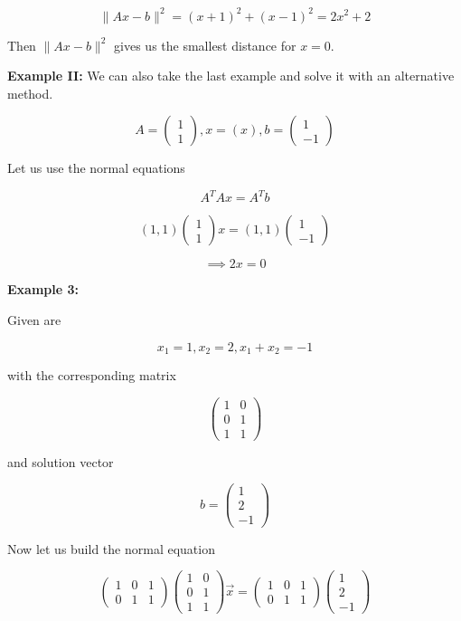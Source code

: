 \[
	\| Ax - b \|^2 = (x + 1)^2 + (x - 1)^2 = 2x^2 + 2 
\]

Then \(\| Ax - b \|^2\) gives us the smallest distance for \(x = 0\).
\vspace{\baselineskip}

\textbf{Example II:}
\vspace{\baselineskip}
We can also take the last example and solve it with an alternative method.

\[
	A = \begin{pmatrix} 1 \\ 1 \end{pmatrix}, x = (x), b = \begin{pmatrix} 1 \\ -1 \end{pmatrix}
\]

Let us use the normal equations

\[
	A^T Ax = A^T b
\]

\[
	(1, 1) 
	\begin{pmatrix} 
	1 \\ 
	1
	\end{pmatrix} x
	= 
	(1, 1)
	\begin{pmatrix} 
		1 \\ 
		-1
	\end{pmatrix} 
\]

\[
	\implies 2x = 0
\]

\textbf{Example 3:}
\vspace{\baselineskip}

Given are 

\[
	x_1 = 1, x_2 = 2, x_1 + x_2 = -1
\]

with the corresponding matrix

\[
	\begin{pmatrix}
		1 & 0 \\
		0 & 1 \\
		1 & 1  
	\end{pmatrix}
\]

and solution vector 

\[
	b = \begin{pmatrix}
		1 \\
		2 \\
		-1
	\end{pmatrix}
\]

Now let us build the normal equation

\[
	\begin{pmatrix}
	1 & 0 & 1 \\
	0 & 1 & 1
	\end{pmatrix}
	\begin{pmatrix}
	1 & 0 \\
	0 & 1 \\
	1 & 1  
	\end{pmatrix}
	\vec{x}
	=
	\begin{pmatrix}
	1 & 0 & 1 \\
	0 & 1 & 1
	\end{pmatrix}
	\begin{pmatrix}
	1 \\
	2 \\
	-1
	\end{pmatrix}
\]

